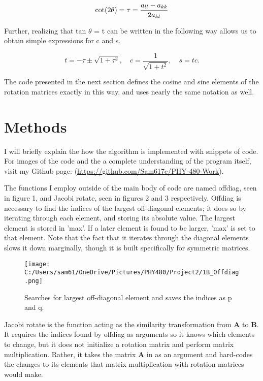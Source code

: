\documentclass[10pt,showpacs,preprintnumbers,footinbib,amsmath,amssymb,aps,prl,twocolumn,groupedaddress,superscriptaddress,showkeys]{revtex4-1}
\begin{document}
\begin{equation}
\textup{cot}(2\theta) = \tau = \frac{a_{ll} - a_{kk}}{2a_{kl}}
\end{equation}

Further, realizing that tan $\theta$ = t can be written in the following way allows us to obtain simple expressions for c and s.

\begin{equation}
t = -\tau \pm \sqrt{1 + \tau^{2}},\quad c = \frac{1}{\sqrt{1 + t^{2}}},\quad s = tc.
\end{equation}

The code presented in the next section defines the cosine and sine elements of the rotation matrices exactly in this way, and uses nearly the same notation as well.

\section{Methods}

I will briefly explain the how the algorithm is implemented with snippets of code. For images of the code and the a complete understanding of the program itself, visit my Github page: (\url{https://github.com/Sam617e/PHY-480-Work}).

The functions I employ outside of the main body of code are named offdiag, seen in figure 1, and Jacobi rotate, seen in figures 2 and 3 respectively. Offdiag is necessary to find the indices of the largest off-diagonal elements; it does so by iterating through each element, and storing its absolute value. The largest element is stored in 'max'. If a later element is found to be larger, 'max' is set to that element. Note that the fact that it iterates through the diagonal elements slows it down marginally, though it is built specifically for symmetric matrices.

\begin{figure}[!ht]
	\centering
	\texttt{[image: C:/Users/sam61/OneDrive/Pictures/PHY480/Project2/1B\_Offdiag.png]}
	\label{uvx}
	\caption{Searches for largest off-diagonal element and saves the indices as p and q.}
\end{figure}

Jacobi rotate is the function acting as the similarity transformation from ${\mathbf A}$ to ${\mathbf B}$. It requires the indices found by offdiag as arguments so it knows which elements to change, but it does not initialize a rotation matrix and perform matrix multiplication. Rather, it takes the matrix ${\mathbf A}$ in as an argument and hard-codes the changes to its elements that matrix multiplication with rotation matrices would make.
\end{document}
